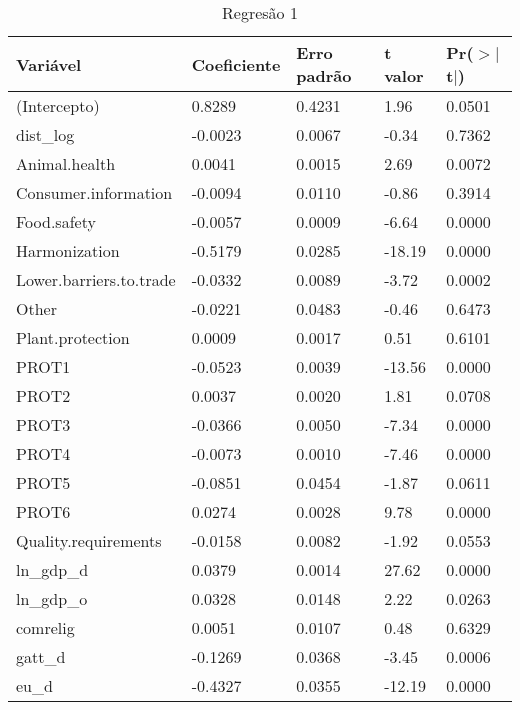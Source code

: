 \begin{flushleft}
  
  \begin{table}[ht]
    \centering
    \begin{tabular}{l|l|l|l|l}
      \hline
      Variável & Coeficiente & Erro padrão & t valor & Pr($>$$|$t$|$) \\ 
      \hline
      (Intercepto) & 0.8289 & 0.4231 & 1.96 & 0.0501 \\ 
    dist\_log & -0.0023 & 0.0067 & -0.34 & 0.7362 \\ 
    Animal.health & 0.0041 & 0.0015 & 2.69 & 0.0072 \\ 
    Consumer.information & -0.0094 & 0.0110 & -0.86 & 0.3914 \\ 
    Food.safety & -0.0057 & 0.0009 & -6.64 & 0.0000 \\ 
    Harmonization & -0.5179 & 0.0285 & -18.19 & 0.0000 \\ 
    Lower.barriers.to.trade & -0.0332 & 0.0089 & -3.72 & 0.0002 \\ 
    Other & -0.0221 & 0.0483 & -0.46 & 0.6473 \\ 
    Plant.protection & 0.0009 & 0.0017 & 0.51 & 0.6101 \\ 
    PROT1 & -0.0523 & 0.0039 & -13.56 & 0.0000 \\ 
    PROT2 & 0.0037 & 0.0020 & 1.81 & 0.0708 \\ 
    PROT3 & -0.0366 & 0.0050 & -7.34 & 0.0000 \\ 
    PROT4 & -0.0073 & 0.0010 & -7.46 & 0.0000 \\ 
    PROT5 & -0.0851 & 0.0454 & -1.87 & 0.0611 \\ 
    PROT6 & 0.0274 & 0.0028 & 9.78 & 0.0000 \\ 
    Quality.requirements & -0.0158 & 0.0082 & -1.92 & 0.0553 \\ 
    ln\_gdp\_d & 0.0379 & 0.0014 & 27.62 & 0.0000 \\ 
    ln\_gdp\_o & 0.0328 & 0.0148 & 2.22 & 0.0263 \\ 
    comrelig & 0.0051 & 0.0107 & 0.48 & 0.6329 \\ 
    gatt\_d & -0.1269 & 0.0368 & -3.45 & 0.0006 \\ 
    eu\_d & -0.4327 & 0.0355 & -12.19 & 0.0000 \\ 
    \hline
  \end{tabular}
  \caption{Regresão 1}
\end{table}
\end{flushleft}

